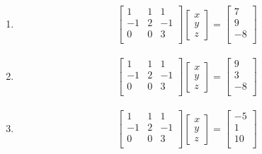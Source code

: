 \documentclass[]{book}
\providecommand{\tightlist}{%
  \setlength{\itemsep}{0pt}\setlength{\parskip}{0pt}}
\theoremstyle{definition}
\theoremstyle{definition}
\theoremstyle{definition}
\theoremstyle{remark}
\begin{document}
\begin{enumerate}
\def\labelenumi{\alph{enumi}.}
\tightlist
\item
  \begin{align*}
  \begin{bmatrix}
  1&1&1\\
  -1&2&-1\\
  0&0&3\\
  \end{bmatrix}
  \begin{bmatrix}
  x \\y \\z
  \end{bmatrix}
  =
  \begin{bmatrix}
  7\\
  9\\
  -8\\
  \end{bmatrix}
  \end{align*}
\item
  \begin{align*}
  \begin{bmatrix}
  1&1&1\\
  -1&2&-1\\
  0&0&3\\
  \end{bmatrix}
  \begin{bmatrix}
  x \\y \\z
  \end{bmatrix}
  =
  \begin{bmatrix}
  9\\
  3\\
  -8\\
  \end{bmatrix}
  \end{align*}
\item
  \begin{align*}
  \begin{bmatrix}
  1&1&1\\
  -1&2&-1\\
  0&0&3\\
  \end{bmatrix}
  \begin{bmatrix}
  x \\y \\z
  \end{bmatrix}
  =
  \begin{bmatrix}
  -5\\
  1\\
  10\\
  \end{bmatrix}
  \end{align*}
\end{enumerate}
\end{document}
